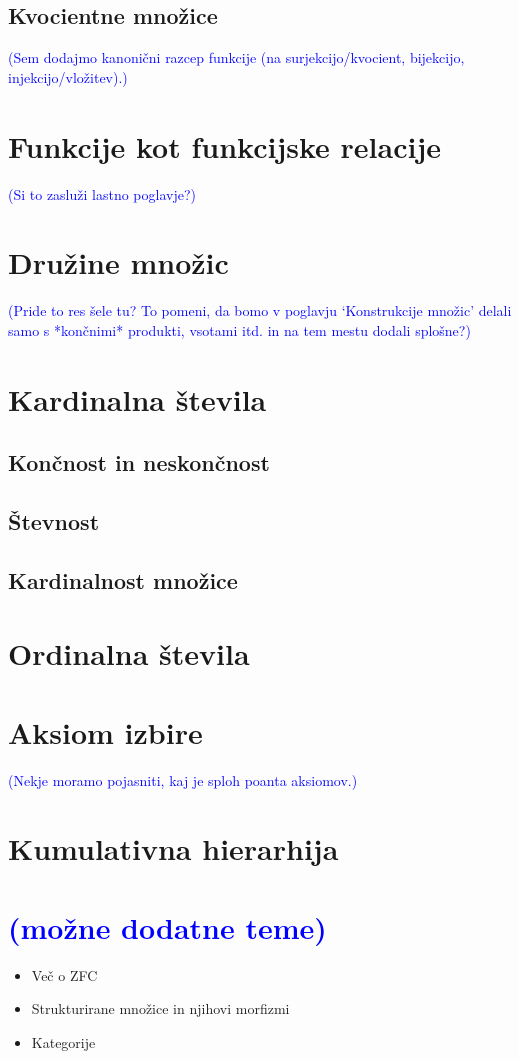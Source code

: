 \documentclass[11pt,a4paper,twoside]{book}
\newcommand{\note}[1]{{\small\textcolor{blue}{(#1)}}}
\begin{document}
		\section{Kvocientne množice}
			\note{Sem dodajmo kanonični razcep funkcije (na surjekcijo/kvocient, bijekcijo, injekcijo/vložitev).}
	
	\chapter{Funkcije kot funkcijske relacije}
		\note{Si to zasluži lastno poglavje?}
	
	\chapter{Družine množic}
		\note{Pride to res šele tu? To pomeni, da bomo v poglavju `Konstrukcije množic' delali samo s *končnimi* produkti, vsotami itd. in na tem mestu dodali splošne?}
	
	\chapter{Kardinalna števila}
		\section{Končnost in neskončnost}
		\section{Števnost}
		\section{Kardinalnost množice}
	
	\chapter{Ordinalna števila}
	
	\chapter{Aksiom izbire}
		\note{Nekje moramo pojasniti, kaj je sploh poanta aksiomov.}
	
	\chapter{Kumulativna hierarhija}
	
	\chapter{\note{možne dodatne teme}}
		\begin{itemize}
			\item
				Več o ZFC
			\item
				Strukturirane množice in njihovi morfizmi
			\item
				Kategorije
		\end{itemize}
	
	
\end{document}
